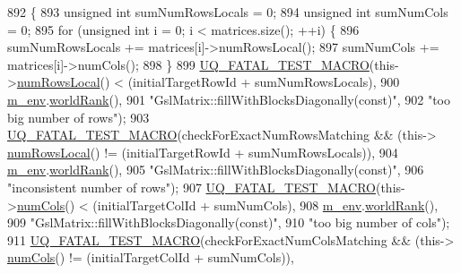 \begin{DoxyCode}
892 \{
893   \textcolor{keywordtype}{unsigned} \textcolor{keywordtype}{int} sumNumRowsLocals = 0;
894   \textcolor{keywordtype}{unsigned} \textcolor{keywordtype}{int} sumNumCols       = 0;
895   \textcolor{keywordflow}{for} (\textcolor{keywordtype}{unsigned} \textcolor{keywordtype}{int} i = 0; i < matrices.size(); ++i) \{
896     sumNumRowsLocals += matrices[i]->numRowsLocal();
897     sumNumCols       += matrices[i]->numCols();
898   \}
899   \hyperlink{_defines_8h_a56d63d18d0a6d45757de47fcc06f574d}{UQ\_FATAL\_TEST\_MACRO}(this->\hyperlink{class_q_u_e_s_o_1_1_gsl_matrix_ab5ec937a9fd439eef1a87e12c0dbccb4}{numRowsLocal}() < (initialTargetRowId + 
      sumNumRowsLocals),
900                       \hyperlink{class_q_u_e_s_o_1_1_matrix_a247fb0fc0b87fecdee054bb4660b68e8}{m\_env}.\hyperlink{class_q_u_e_s_o_1_1_base_environment_a78b57112bbd0e6dd0e8afec00b40ffa7}{worldRank}(),
901                       \textcolor{stringliteral}{"GslMatrix::fillWithBlocksDiagonally(const)"},
902                       \textcolor{stringliteral}{"too big number of rows"});
903   \hyperlink{_defines_8h_a56d63d18d0a6d45757de47fcc06f574d}{UQ\_FATAL\_TEST\_MACRO}(checkForExactNumRowsMatching && (this->
      \hyperlink{class_q_u_e_s_o_1_1_gsl_matrix_ab5ec937a9fd439eef1a87e12c0dbccb4}{numRowsLocal}() != (initialTargetRowId + sumNumRowsLocals)),
904                       \hyperlink{class_q_u_e_s_o_1_1_matrix_a247fb0fc0b87fecdee054bb4660b68e8}{m\_env}.\hyperlink{class_q_u_e_s_o_1_1_base_environment_a78b57112bbd0e6dd0e8afec00b40ffa7}{worldRank}(),
905                       \textcolor{stringliteral}{"GslMatrix::fillWithBlocksDiagonally(const)"},
906                       \textcolor{stringliteral}{"inconsistent number of rows"});
907   \hyperlink{_defines_8h_a56d63d18d0a6d45757de47fcc06f574d}{UQ\_FATAL\_TEST\_MACRO}(this->\hyperlink{class_q_u_e_s_o_1_1_gsl_matrix_ad5005f168fe030468e834776afb1859b}{numCols}() < (initialTargetColId + sumNumCols),
908                       \hyperlink{class_q_u_e_s_o_1_1_matrix_a247fb0fc0b87fecdee054bb4660b68e8}{m\_env}.\hyperlink{class_q_u_e_s_o_1_1_base_environment_a78b57112bbd0e6dd0e8afec00b40ffa7}{worldRank}(),
909                       \textcolor{stringliteral}{"GslMatrix::fillWithBlocksDiagonally(const)"},
910                       \textcolor{stringliteral}{"too big number of cols"});
911   \hyperlink{_defines_8h_a56d63d18d0a6d45757de47fcc06f574d}{UQ\_FATAL\_TEST\_MACRO}(checkForExactNumColsMatching && (this->
      \hyperlink{class_q_u_e_s_o_1_1_gsl_matrix_ad5005f168fe030468e834776afb1859b}{numCols}() != (initialTargetColId + sumNumCols)),

\end{DoxyCode}
